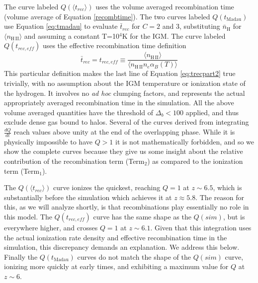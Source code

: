 The curve labeled $Q(\langle t_{rec}\rangle)$ uses the volume averaged recombination time (volume average of Equation \ref{recombtime}).  The two curves labeled $Q(t_\mathrm{Madau})$ use Equation \eqref{eq:tmadau} to evaluate $\bar{t}_{rec}$ for $C=2$ and $3$, substituting $\bar{n}_\mathrm{H}$ for $\langle n_\mathrm{H\,II} \rangle$ and assuming a constant T=10$^4$K for the IGM. 
The curve labeled $Q(t_{rec,eff})$ uses the effective recombination time definition 
\begin{equation}
	\label{eq:treceff}
	\bar{t}_{rec}=t_{rec,eff}\equiv \frac{\langle n_\mathrm{H\,II}\rangle}{\langle n_\mathrm{H\,II} n_e \alpha_B(T)\rangle}
\end{equation}
This particular definition makes the last line of Equation \eqref{eq:trecpart2} true trivially, with no assumption about the IGM temperature or ionization state of the hydrogen.  It involves no {\em ad hoc} clumping factors, and represents the actual appropriately averaged recombination time in the simulation. All the above volume averaged quantities have the threshold of $\Delta_b<100$ applied, and thus exclude dense gas bound to halos.   
Several of the curves derived from integrating $\frac{dQ}{dt}$ reach values above unity at the end of the overlapping phase. While it is physically impossible to have $Q>1$ it is not mathematically forbidden, and so we show the complete curves because they give us some insight about the relative contribution of the recombination term (Term$_2$) as compared to the ionization term (Term$_1$).

The $Q(\langle t_{rec}\rangle)$ curve ionizes the quickest, reaching  $Q=1$ at $z\sim 6.5$, which is substantially before the simulation which achieves it at $z\approx 5.8$. The reason for this, as we will analyze shortly, is that recombinations play essentially no role in this model. The $Q(t_{rec,eff})$ curve has the same shape as the $Q(sim)$, but is everywhere higher, and crosses $Q=1$ at $z\sim 6.1$. Given that this integration uses the actual ionization rate density and effective recombination time in the simulation, this discrepancy demands an explanation. We address this below. Finally the $Q(t_\mathrm{Madau})$ curves do not match the shape of the $Q(sim)$ curve, ionizing more quickly at early times, and exhibiting a maximum value for $Q$ at $z \sim 6$. 

